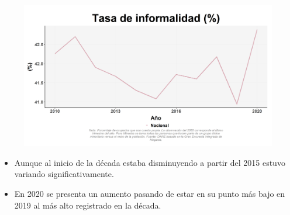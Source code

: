     \begin{figure}[H]
        \caption[Tasa de informalidad a nivel nacional ]{\label{informal_nal_trend} }
        \begin{center}
        \includegraphics[width=\textwidth,keepaspectratio]{img/var_70_trend.png}
        \end{center}
    \end{figure}
            \begin{itemize}
                \item Aunque al inicio de la década estaba disminuyendo a partir del 2015 estuvo variando significativamente.
                \item En 2020 se presenta un aumento pasando de estar en su punto más bajo en 2019 al más alto registrado en la década.
                \end{itemize}

